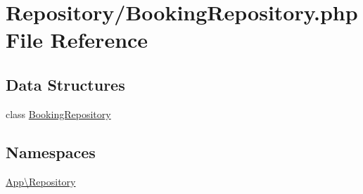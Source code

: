 \hypertarget{_booking_repository_8php}{}\section{Repository/\+Booking\+Repository.php File Reference}
\label{_booking_repository_8php}
\subsection*{Data Structures}
\begin{DoxyCompactItemize}
\item 
class \mbox{\hyperlink{class_app_1_1_repository_1_1_booking_repository}{Booking\+Repository}}
\end{DoxyCompactItemize}
\subsection*{Namespaces}
\begin{DoxyCompactItemize}
\item 
 \mbox{\hyperlink{namespace_app_1_1_repository}{App\textbackslash{}\+Repository}}
\end{DoxyCompactItemize}
